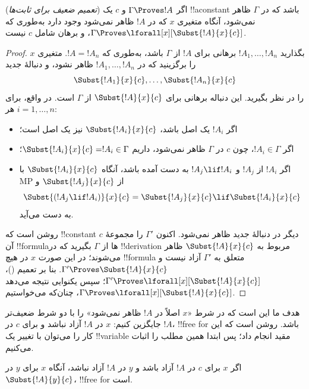 \documentclass[../../../include/open-logic-section]{subfiles}
\begin{document}
\begin{thm}
(\emph{تعمیم ضعیف برای ثابت‌ها})
اگر $\Gamma\Proves !A$ و $c$ یک !!a{constant} باشد که در $\Gamma$
ظاهر نمی‌شود، آنگاه متغیری $x$ که در $!A$ ظاهر نمی‌شود وجود دارد به‌طوری
که $\Gamma\Proves\lforall[x][\Subst{!A}{x}{c}]$، و برهان شامل $c$ نیست.
\end{thm}

\begin{proof}
بگذارید $!A_1,\ldots,!A_n$ برهانی برای $!A$ از $\Gamma$ باشد، به‌طوری
که $!A=!A_n$. متغیری $x$ را برگزینید که در
$!A_1,\ldots,!A_n$ ظاهر نشود، و دنبالهٔ جدید
\[
\Subst{!A_1}{x}{c},\ldots,\Subst{!A_n}{x}{c}
\]
را در نظر بگیرید. این دنباله برهانی برای
$\Subst{!A}{x}{c}$ از $\Gamma$ است. در واقع، برای هر
$i=1,\ldots,n$:
\begin{itemize}
\item اگر $!A_i$ یک اصل باشد، $\Subst{!A_i}{x}{c}$ نیز یک اصل است؛
\item اگر $!A_i\in\Gamma$، چون $c$ در $\Gamma$ ظاهر نمی‌شود، داریم
$\Subst{!A_i}{x}{c}=!A_i\in\Gamma$؛
\item اگر $!A_i$ از $!A_j$ و $!A_j\lif !A_i$ به دست آمده باشد، آنگاه
$\Subst{!A_i}{x}{c}$ با MP از $\Subst{!A_j}{x}{c}$ و
\[
\Subst{(!A_j \lif !A_i)}{x}{c}
=
\Subst{!A_j}{x}{c} \lif \Subst{!A_i}{x}{c}
\]
به دست می‌آید.
\end{itemize}
روشن است که !!{constant} $c$ دیگر در دنبالهٔ جدید ظاهر نمی‌شود.
اکنون $\Gamma'$ را مجموعهٔ آن !!{formula}ها از $\Gamma$ بگیرید که در
!!{derivation} مربوط به $\Subst{!A}{x}{c}$ ظاهر می‌شوند؛ در این صورت
$x$ در هیچ !!{formula} متعلق به $\Gamma'$ آزاد نیست و
$\Gamma'\Proves\Subst{!A}{x}{c}$. بنا بر تعمیم
()،
$\Gamma'\Proves\lforall[x][\Subst{!A}{x}{c}]$؛ سپس یکنوایی نتیجه می‌دهد
$\Gamma\Proves\lforall[x][\Subst{!A}{x}{c}]$، چنان‌که می‌خواستیم.
\end{proof}

\begin{explain}
هدف ما این است که در  شرط «$x$ اصلاً در $!A$ ظاهر
نمی‌شود» را با دو شرط ضعیف‌تر جایگزین کنیم: $x$ در $!A$ آزاد نباشد و
برای $c$ در $!A$، !!{free for} باشد. روشن است که این کار را می‌توان با
تغییر یک !!{variable} مقید انجام داد؛ پس ابتدا همین مطلب را اثبات می‌کنیم.
\end{explain}

\begin{lem}
اگر $x$ برای $c$ در $!A$ آزاد باشد و $y$ در $!A$ آزاد نباشد، آنگاه
$x$ برای $y$ در $\Subst{!A}{y}{c}$، !!{free for} است.
\end{lem}
\end{document}
